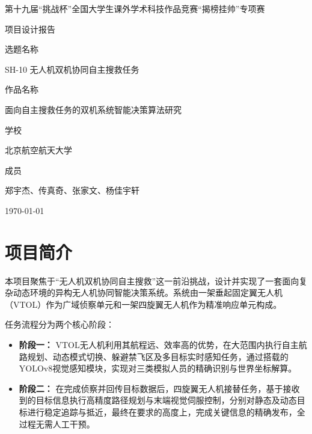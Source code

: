 \documentclass[12pt]{article}
\begin{document}
\begin{titlepage}
    \centering
    
    \vspace*{1cm}
    {\fontsize{24pt}{0}\selectfont 第十九届“挑战杯”全国大学生课外学术科技作品竞赛“揭榜挂帅”专项赛}
    
    \vspace{1.5cm}
    {\fontsize{24pt}{0}\selectfont 项目设计报告}
    
    \vspace{2cm}
    {\fontsize{18pt}{0}\selectfont 选题名称}
    
    \vspace{0.5cm}
    {\fontsize{14pt}{0}\selectfont SH-10 无人机双机协同自主搜救任务}
    
    \vspace{2cm}
    {\fontsize{18pt}{0}\selectfont 作品名称}
    
    \vspace{0.5cm}
    {\fontsize{14pt}{0}\selectfont 面向自主搜救任务的双机系统智能决策算法研究}
    
    \vspace{2cm}
    {\fontsize{18pt}{0}\selectfont 学校}
    
    \vspace{0.5cm}
    {\fontsize{14pt}{0}\selectfont 北京航空航天大学}
    
    \vspace{2cm}
    {\fontsize{18pt}{0}\selectfont 成员}
    
    \vspace{0.5cm}
    {\fontsize{14pt}{0}\selectfont 郑宇杰、传真奇、张家文、杨佳宇轩}
    
    \vfill
    \large \today
\end{titlepage}

\tableofcontents
\newpage

\section{项目简介}
本项目聚焦于“无人机双机协同自主搜救”这一前沿挑战，设计并实现了一套面向复杂动态环境的异构无人机协同智能决策系统。系统由一架垂起固定翼无人机（VTOL）作为广域侦察单元和一架四旋翼无人机作为精准响应单元构成。

任务流程分为两个核心阶段：
\begin{itemize}
    \item \textbf{阶段一：} VTOL无人机利用其航程远、效率高的优势，在大范围内执行自主航路规划、动态模式切换、躲避禁飞区及多目标实时感知任务，通过搭载的YOLOv8视觉感知模块，实现对三类模拟人员的精确识别与世界坐标解算。
    \item \textbf{阶段二：} 在完成侦察并回传目标数据后，四旋翼无人机接替任务，基于接收到的目标信息执行高精度路径规划与末端视觉伺服控制，分别对静态及动态目标进行稳定追踪与抵近，最终在要求的高度上，完成关键信息的精确发布，全过程无需人工干预。
\end{itemize}
\end{document}

